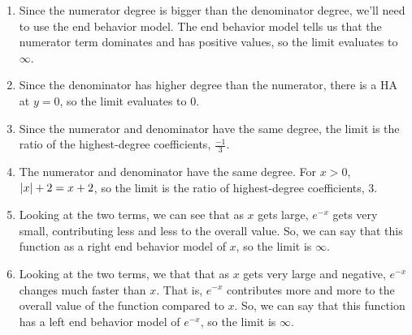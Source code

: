 \begin{enumerate}
	\item Since the numerator degree is bigger than the denominator degree, we'll need to use the end behavior model.
		The end behavior model tells us that the numerator term dominates and has positive values, so the limit evaluates to $\infty$.
	\item Since the denominator has higher degree than the numerator, there is a HA at $y=0$, so the limit evaluates to $0$.
	\item Since the numerator and denominator have the same degree, the limit is the ratio of the highest-degree coefficients, $\frac{-1}{3}$.
	\item The numerator and denominator have the same degree. For $x > 0$, $\lvert x \rvert+2 = x+2$, so the limit is the ratio of highest-degree coefficients, $3$.
	\item Looking at the two terms, we can see that as $x$ gets large, $e^{-x}$ gets very small, contributing less and less to the overall value.
		So, we can say that this function as a right end behavior model of $x$, so the limit is $\infty$.
	\item Looking at the two terms, we that that as $x$ gets very large and negative, $e^{-x}$ changes much faster than $x$.
		That is, $e^{-x}$ contributes more and more to the overall value of the function compared to $x$.
		So, we can say that this function has a left end behavior model of $e^{-x}$, so the limit is $\infty$.
\end{enumerate}